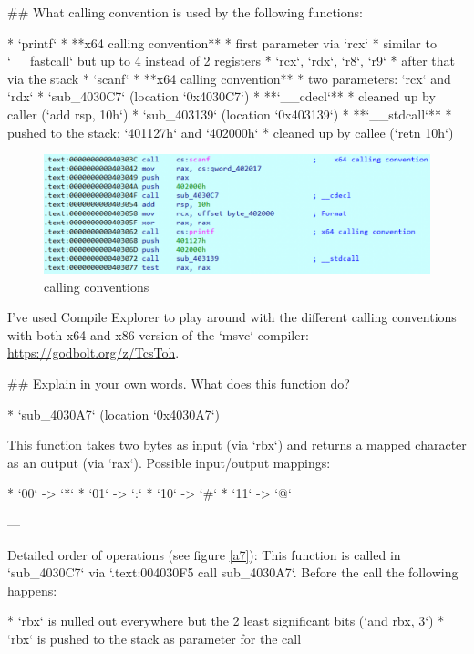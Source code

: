 \begin{markdown}
## What calling convention is used by the following functions:

* `printf`
    * **x64 calling convention**
        * first parameter via `rcx`
        * similar to `__fastcall` but up to 4 instead of 2 registers
            * `rcx`, `rdx`, `r8`, `r9`
            * after that via the stack
* `scanf`
    * **x64 calling convention**
        * two parameters: `rcx` and `rdx`
* `sub_4030C7` (location `0x4030C7`)
    * **`__cdecl`**
        * cleaned up by caller (`add rsp, 10h`)
* `sub_403139` (location `0x403139`)
    * **`__stdcall`**
        * pushed to the stack: `401127h` and `402000h`
        * cleaned up by callee (`retn 10h`)
        
\begin{figure}[!htbp]
\centering
\includegraphics[width=\linewidth]{media/call.png}
\caption{calling conventions}\label{export}
\end{figure}

\noindent\s I've used Compile Explorer to play around with the different calling conventions with both x64 and x86 version of the `msvc` compiler: \href{https://godbolt.org/z/TcsToh}{https://godbolt.org/z/TcsToh}.

## Explain in your own words. What does this function do?

* `sub_4030A7` (location `0x4030A7`)

\noindent\s This function takes two bytes as input (via `rbx`) and returns a mapped character as an output (via `rax`).
\n
Possible input/output mappings:\s

* `00` -> `*`
* `01` -> `:`
* `10` -> `#`
* `11` -> `@`

---

\noindent Detailed order of operations (see figure \ref{a7}):
\n
\noindent This function is called in `sub_4030C7` via `.text:004030F5 call    sub_4030A7`. Before the call the following happens:\s

* `rbx` is nulled out everywhere but the 2 least significant bits (`and rbx, 3`)
* `rbx` is pushed to the stack as parameter for the call


\end{markdown}
